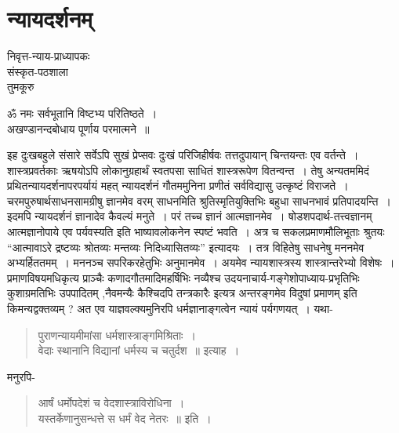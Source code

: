 {\fontsize{15}{17}\selectfont
\presetvalues
\chapter{न्यायदर्शनम्}

\begin{center}
\smallskip
निवृत्त-न्याय-प्राध्यापकः\\
संस्कृत-पठशाला\\
तुमकूरु
\addrule
\end{center}
\begin{center}
{ॐ नमः सर्वभूतानि विष्टभ्य परितिष्ठते~। \\
अखण्डानन्दबोधाय पूर्णाय परमात्मने~॥}
\end{center}

इह दुःखबहुले संसारे सर्वेऽपि सुखं प्रेप्सवः दुःखं परिजिहीर्षवः तत्तदुपायान् चिन्तयन्तः एव वर्तन्ते~। शास्त्रप्रवर्तकाः ऋषयोऽपि लोकानुग्रहार्थं स्वतपसा साधितं शास्त्ररूपेण वितन्वन्त~। तेषु अन्यतममिदं प्रथितन्यायदर्शनापरपर्यायं महत् न्यायदर्शनं गौतममुनिना प्रणीतं सर्वविद्यासु उत्कृष्टं विराजते~। चरमपुरुषार्थसाधनसामग्रीषु ज्ञानमेव वरम् साधनमिति श्रुतिस्मृतियुक्तिभिः बहुधा साधनभावं प्रतिपादयन्ति~। इदमपि न्यायदर्शनं ज्ञानादेव कैवल्यं मनुते~। परं तच्च ज्ञानं आत्मज्ञानमेव~। षोडशपदार्थ-तत्त्वज्ञानम् आत्मज्ञानोपाये एव पर्यवस्यति इति भाष्यावलोकनेन स्पष्टं भवति~। अत्र च सकलप्रमाणमौलिभूताः श्रुतयः “आत्मावाऽरे द्रष्टव्यः श्रोतव्यः मन्तव्यः निदिध्यासितव्यः” इत्यादयः~। तत्र विहितेषु साधनेषु मननमेव अभ्यर्हिततमम्~। मननञ्च सपरिकरहेतुभिः अनुमानमेव~। अयमेव न्यायशास्त्रस्य शास्त्रान्तरेभ्यो विशेषः~। प्रमाणविषयमधिकृत्य प्राञ्चैः कणादगौतमादिमहर्षिभिः नव्यैश्च उदयनाचार्य-गङ्गेशोपाध्याय-प्रभृतिभिः कुशाग्रमतिभिः उपपादितम् ,नैवमन्यैः कैश्चिदपि तन्त्रकारैः इत्यत्र अन्तरङ्गमेव विदुषां प्रमाणम् इति किमन्यद्वक्तव्यम् ?  अत एव याज्ञवल्क्यमुनिरपि धर्मज्ञानाङ्गत्वेन न्यायं पर्यगणयत्~। यथा- 
\begin{verse}
पुराणन्यायमीमांसा धर्मशास्त्राङ्गमिश्रिताः~। \\
वेदाः स्थानानि विद्यानां धर्मस्य च चतुर्दश~॥ इत्याह~। 
\end{verse}    

मनुरपि-

\begin{verse}
आर्षं धर्मोपदेशं च वेदशास्त्राविरोधिना~। \\
यस्तर्केणानुसन्धत्ते स धर्मं वेद नेतरः~॥ इति~। 
\end{verse}

}

